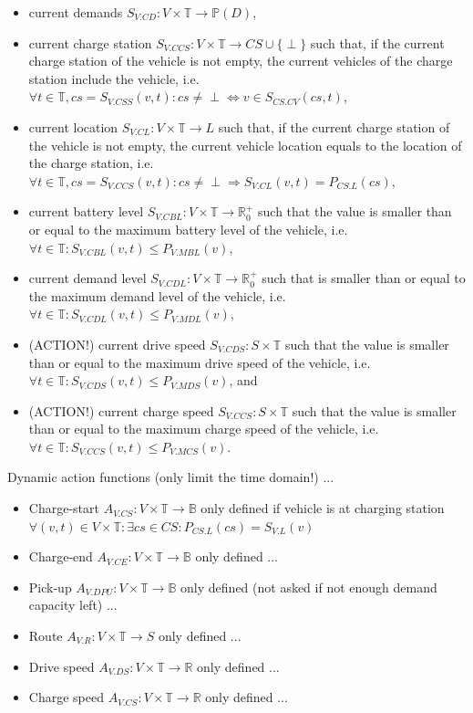 \documentclass{IEEEtran}
\begin{document}
    \begin{itemize}
        \item current demands $S_{V.CD}: V \times \mathbb{T} \rightarrow \mathbb{P}(D)$,
        \item current charge station $S_{V.CCS}: V \times \mathbb{T} \rightarrow CS \cup \{\perp\}$ such that, if the current charge station of the vehicle is not empty, the current vehicles of the charge station include the vehicle, i.e.\ $\forall t \in \mathbb{T}, cs = S_{V.CSS}(v,t): cs \neq \perp \Leftrightarrow v \in S_{CS.CV}(cs,t)$,
        \item current location $S_{V.CL}: V \times \mathbb{T} \rightarrow L$ such that, if the current charge station of the vehicle is not empty, the current vehicle location equals to the location of the charge station, i.e.\ $\forall t \in \mathbb{T}, cs = S_{V.CCS}(v,t): cs \neq \perp \Rightarrow S_{V.CL}(v,t)=P_{CS.L}(cs)$,
        \item current battery level $S_{V.CBL}: V \times \mathbb{T} \rightarrow \mathbb{R}_0^+$ such that the value is smaller than or equal to the maximum battery level of the vehicle, i.e.\ $\forall t \in \mathbb{T}: S_{V.CBL}(v,t) \leq P_{V.MBL}(v)$,
        \item current demand level $S_{V.CDL}: V \times \mathbb{T} \rightarrow \mathbb{R}_0^+$ such that is smaller than or equal to the maximum demand level of the vehicle, i.e.\ $\forall t \in \mathbb{T}: S_{V.CDL}(v,t) \leq P_{V.MDL}(v)$,
        \item (ACTION!) current drive speed $S_{V.CDS}: S \times \mathbb{T}$ such that the value is smaller than or equal to the maximum drive speed of the vehicle, i.e.\ $\forall t \in \mathbb{T}: S_{V.CDS}(v,t) \leq P_{V.MDS}(v)$, and
        \item (ACTION!) current charge speed $S_{V.CCS}: S \times \mathbb{T}$ such that the value is smaller than or equal to the maximum charge speed of the vehicle, i.e.\ $\forall t \in \mathbb{T}: S_{V.CCS}(v,t) \leq P_{V.MCS}(v)$.
    \end{itemize}
    Dynamic action functions (only limit the time domain!) ...
    \begin{itemize}
        \item Charge-start $A_{V.CS}: V \times \mathbb{T} \rightarrow \mathbb{B}$ only defined if vehicle is at charging station $\forall (v,t) \in V \times \mathbb{T}: \exists cs \in CS: P_{CS.L}(cs) = S_{V.L}(v)$
        \item Charge-end $A_{V.CE}: V \times \mathbb{T} \rightarrow \mathbb{B}$ only defined ...
        \item Pick-up $A_{V.DPU}: V \times \mathbb{T} \rightarrow \mathbb{B}$ only defined (not asked if not enough demand capacity left) ...
        \item Route $A_{V.R}: V \times \mathbb{T} \rightarrow S$ only defined ...
        \item Drive speed $A_{V.DS}: V \times \mathbb{T} \rightarrow \mathbb{R}$ only defined ...
        \item Charge speed $A_{V.CS}: V \times \mathbb{T} \rightarrow \mathbb{R}$ only defined ...
    \end{itemize}
\end{document}
